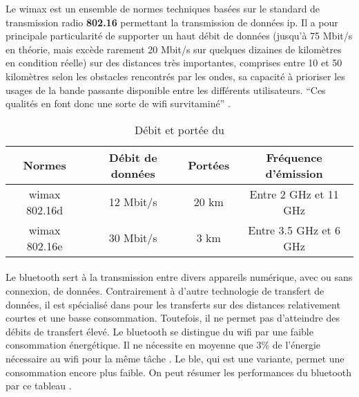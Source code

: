 Le \gls{wimax} est un ensemble de normes techniques basées sur le standard de transmission radio \textbf{802.16}
permettant la transmission de données \gls{ip}.\newline
Il a pour principale particularité de supporter un haut débit de données (jusqu’à 75 Mbit/s en théorie, mais
excède rarement 20 Mbit/s sur quelques dizaines de kilomètres en condition réelle) sur des distances très importantes,
comprises entre 10 et 50 kilomètres selon les obstacles rencontrés par les ondes, sa capacité à prioriser les usages de
la bande passante disponible entre les différents utilisateurs. \enquote{Ces qualités en font donc une sorte
    de \gls{wifi} survitaminé} \cite{wimax}.

\begin{table}[ht!]
    \centering
    \begin{tabular}{|c|c|c|c|}
        \hline
        \rowcolor{tableColorDark} Normes & Débit de données & Portées & Fréquence d'émission   \\
        \hline

        \gls{wimax} 802.16d              & 12 Mbit/s        & 20 km   & Entre 2 GHz et 11 GHz  \\\hline
        \gls{wimax} 802.16e              & 30 Mbit/s        & 3 km    & Entre 3.5 GHz et 6 GHz \\\hline
    \end{tabular}
    \label{tab:debitPorteeWimax}
    \caption{Débit et portée du }
    \nocite{debitPortee}
\end{table}


\paragraph{}
\label{sec:bluetooth}

Le \gls{bluetooth} sert à la transmission entre divers appareils numérique, avec ou sans connexion,
de données. Contrairement à d'autre technologie de transfert de données, il est
spécialisé dans pour les transferts sur des distances relativement courtes et une basse
consommation. Toutefois, il ne permet pas d'atteindre des débits de transfert élevé.\newline
Le \gls{bluetooth} se distingue du \gls{wifi} par une faible consommation énergétique. Il
ne nécessite en moyenne que 3\% de l'énergie nécessaire au \gls{wifi} pour la même tâche \cite{bluetoothConsumption}.
Le \gls{ble}, qui est une variante, permet une consommation encore plus faible.\newline
On peut résumer les performances du \gls{bluetooth} par ce tableau \cite{debitPortee, ble}.

